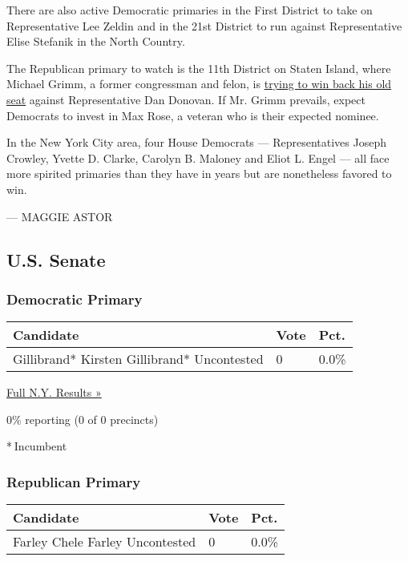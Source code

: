 There are also active Democratic primaries in the First District to take
on Representative Lee Zeldin and in the 21st District to run against
Representative Elise Stefanik in the North Country.

The Republican primary to watch is the 11th District on Staten Island,
where Michael Grimm, a former congressman and felon, is
\href{https://www.nytimes3xbfgragh.onion/2017/10/01/nyregion/staten-island-congressman-grimm.html}{trying
to win back his old seat} against Representative Dan Donovan. If Mr.
Grimm prevails, expect Democrats to invest in Max Rose, a veteran who is
their expected nominee.

In the New York City area, four House Democrats --- Representatives
Joseph Crowley, Yvette D. Clarke, Carolyn B. Maloney and Eliot L. Engel
--- all face more spirited primaries than they have in years but are
nonetheless favored to win.

--- MAGGIE ASTOR

\hypertarget{us-senate}{%
\subsection{U.S. Senate}\label{us-senate}}

\hypertarget{democratic-primary}{%
\subsubsection{Democratic Primary}\label{democratic-primary}}

\begin{longtable}[]{@{}lll@{}}
\toprule
Candidate & Vote & Pct.\tabularnewline
\midrule
\endhead
 Gillibrand* Kirsten Gillibrand* Uncontested & 0 & 0.0\%\tabularnewline
\bottomrule
\end{longtable}

\href{https://www.nytimes3xbfgragh.onion/elections/results/new-york}{Full
N.Y. Results »}

0\% reporting (0 of 0 precincts)

* Incumbent

\hypertarget{republican-primary}{%
\subsubsection{Republican Primary}\label{republican-primary}}

\begin{longtable}[]{@{}lll@{}}
\toprule
Candidate & Vote & Pct.\tabularnewline
\midrule
\endhead
 Farley Chele Farley Uncontested & 0 & 0.0\%\tabularnewline
\bottomrule
\end{longtable}

